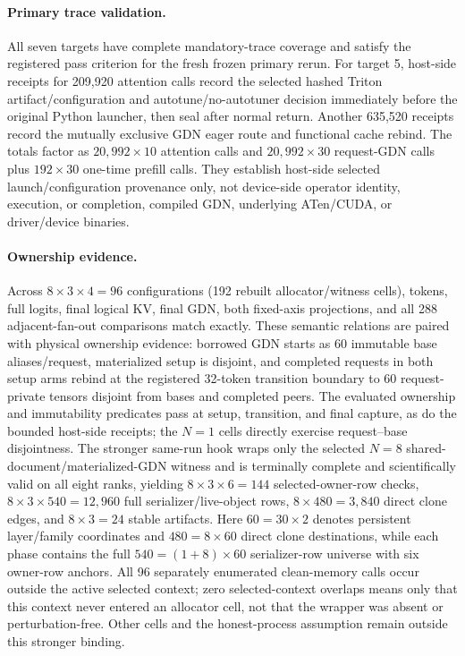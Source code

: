 \documentclass{article}
\begin{document}
\paragraph{Primary trace validation.}
\label{sec:target-status}
All seven targets have complete mandatory-trace coverage and satisfy the
registered pass criterion for the fresh frozen primary rerun.  For target 5,
host-side receipts for 209,920 attention calls record the selected hashed
Triton artifact/configuration and autotune/no-autotuner decision immediately
before the original Python launcher, then seal after normal return.  Another
635,520 receipts record the mutually exclusive GDN eager route and functional
cache rebind.  The totals factor as $20{,}992\times10$ attention calls and
$20{,}992\times30$ request-GDN calls plus $192\times30$ one-time prefill calls.
They establish host-side selected launch/configuration provenance only, not
device-side operator identity, execution, or completion, compiled GDN,
underlying ATen/CUDA, or driver/device binaries.

\paragraph{Ownership evidence.}
Across $8\times3\times4=96$ configurations (192 rebuilt allocator/witness
cells), tokens, full logits, final logical KV, final GDN, both fixed-axis
projections, and all 288 adjacent-fan-out comparisons match exactly.  These
semantic relations are paired with physical ownership evidence: borrowed GDN
starts as 60 immutable base aliases/request, materialized setup is disjoint,
and completed requests in both setup arms rebind at the registered 32-token
transition boundary to 60 request-private tensors disjoint from bases and
completed peers.  The evaluated ownership and immutability predicates pass at
setup, transition, and final capture, as do the bounded host-side receipts; the
$N=1$ cells directly exercise request--base disjointness.  The stronger
same-run hook wraps only the selected $N=8$ shared-document/materialized-GDN
witness and is terminally complete and scientifically valid on all eight ranks,
yielding $8\times3\times6=144$ selected-owner-row checks,
$8\times3\times540=12{,}960$ full serializer/live-object rows,
$8\times480=3{,}840$ direct clone edges, and $8\times3=24$ stable artifacts.
Here $60=30\times2$ denotes persistent layer/family coordinates and
$480=8\times60$ direct clone destinations, while each phase contains the full
$540=(1+8)\times60$ serializer-row universe with six owner-row anchors.  All 96
separately enumerated clean-memory calls occur outside the active selected
context; zero selected-context overlaps means only that this context never
entered an allocator cell, not that the wrapper was absent or
perturbation-free.  Other cells and the honest-process assumption remain outside
this stronger binding.
\end{document}
